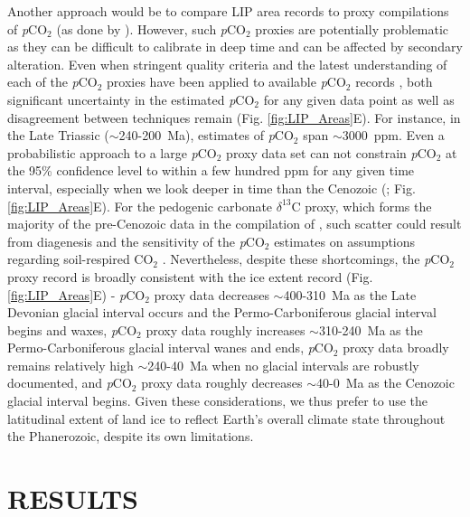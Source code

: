 \documentclass[11pt,letterpaper]{article}
\newcommand{\dC}{$\delta^{13}$C\xspace}
\begin{document}
Another approach would be to compare LIP area records to proxy compilations of \textit{p}CO$_2$ (as done by \citealp{Johansson2018a}). However, such \textit{p}CO$_2$ proxies are potentially problematic as they can be difficult to calibrate in deep time and can be affected by secondary alteration. Even when stringent quality criteria and the latest understanding of each of the \textit{p}CO$_2$ proxies have been applied to available \textit{p}CO$_2$ records \citep{Foster2017a}, both significant uncertainty in the estimated \textit{p}CO$_2$ for any given data point as well as disagreement between techniques remain (Fig. \ref{fig:LIP_Areas}E). For instance, in the Late Triassic ($\sim$240-200~Ma), estimates of \textit{p}CO$_2$ span $\sim$3000~ppm. Even a probabilistic approach to a large \textit{p}CO$_2$ proxy data set can not constrain \textit{p}CO$_2$ at the 95\% confidence level to within a few hundred ppm for any given time interval, especially when we look deeper in time than the Cenozoic (\citealp{Foster2017a}; Fig. \ref{fig:LIP_Areas}E). For the pedogenic carbonate \dC proxy, which forms the majority of the pre-Cenozoic data in the compilation of \citet{Foster2017a}, such scatter could result from diagenesis \citep{Michel2016a} and the sensitivity of the \textit{p}CO$_2$ estimates on assumptions regarding soil-respired CO$_{2}$ \citep{Montanez2013a}. Nevertheless, despite these shortcomings, the \textit{p}CO$_2$ proxy record is broadly consistent with the ice extent record (Fig. \ref{fig:LIP_Areas}E) - \textit{p}CO$_2$ proxy data decreases $\sim$400-310~Ma as the Late Devonian glacial interval occurs and the Permo-Carboniferous glacial interval begins and waxes, \textit{p}CO$_2$ proxy data roughly increases $\sim$310-240~Ma as the Permo-Carboniferous glacial interval wanes and ends, \textit{p}CO$_2$ proxy data broadly remains relatively high $\sim$240-40~Ma when no glacial intervals are robustly documented, and \textit{p}CO$_2$ proxy data roughly decreases $\sim$40-0~Ma as the Cenozoic glacial interval begins. Given these considerations, we thus prefer to use the latitudinal extent of land ice to reflect Earth's overall climate state throughout the Phanerozoic, despite its own limitations.

\section*{RESULTS}
\end{document}
